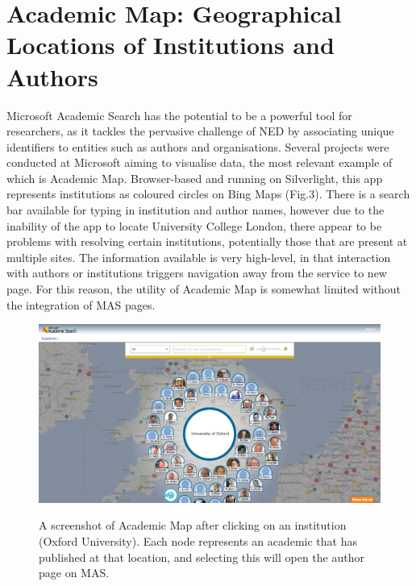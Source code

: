 \documentclass[PROP_AGutteridge_CS.tex]{subfiles}
\begin{document}
\section{Academic Map: Geographical Locations of Institutions and Authors}
Microsoft Academic Search has the potential to be a powerful tool for researchers, as it tackles the pervasive challenge of NED by associating unique identifiers to entities such as authors and organisations. Several projects were conducted at Microsoft aiming to visualise data, the most relevant example of which is Academic Map. Browser-based and running on Silverlight, this app represents institutions as coloured circles on Bing Maps (Fig.3). There is a search bar available for typing in institution and author names, however due to the inability of the app to locate University College London, there appear to be problems with resolving certain institutions, potentially those that are present at multiple sites. The information available is very high-level, in that interaction with authors or institutions triggers navigation away from the service to new page. For this reason, the utility of Academic Map is somewhat limited without the integration of MAS pages.

\begin{figure}[ht]
	\includegraphics[width=\textwidth]{../lib/images/AM}
	\label{fig:AM}
\caption{A screenshot of Academic Map after clicking on an institution (Oxford University). Each node represents an academic that has published at that location, and selecting this will open the author page on MAS.}
\end{figure}
\end{document}
